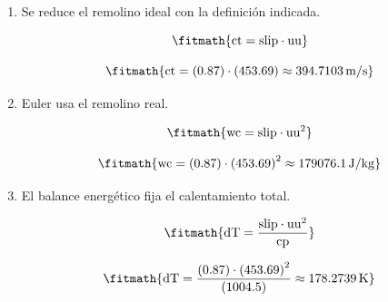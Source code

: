 \begin{enumerate}

\item Se reduce el remolino ideal con la definición indicada.

\[\fitmath{\mathrm{ct}=\mathrm{slip}\cdot \mathrm{uu}}\]

\[\fitmath{\mathrm{ct}=(0.87)\cdot (453.69)\approx 394.7103\,\mathrm{m/s}}\]

\item Euler usa el remolino real.

\[\fitmath{\mathrm{wc}=\mathrm{slip}\cdot {\mathrm{uu}}^{2}}\]

\[\fitmath{\mathrm{wc}=(0.87)\cdot {(453.69)}^{2}\approx 179076.1\,\mathrm{J/kg}}\]

\item El balance energético fija el calentamiento total.

\[\fitmath{\mathrm{dT}=\frac{\mathrm{slip}\cdot {\mathrm{uu}}^{2}}{\mathrm{cp}}}\]

\[\fitmath{\mathrm{dT}=\frac{(0.87)\cdot {(453.69)}^{2}}{(1004.5)}\approx 178.2739\,\mathrm{K}}\]

\end{enumerate}
